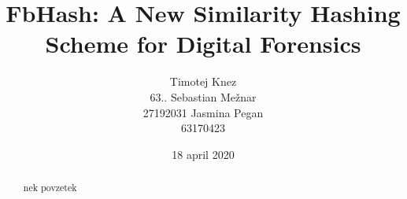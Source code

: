 \documentclass{acm_proc_article-sp}
\begin{document}
\title{FbHash: A New Similarity Hashing Scheme for Digital Forensics}

\author{
\alignauthor
Timotej Knez \\
63..%
\alignauthor
Sebastian Mežnar\\
27192031 %
\alignauthor 
Jasmina Pegan \\
63170423%
}

\date{18 april 2020}

\maketitle
\begin{abstract}
nek povzetek
\end{abstract}



\end{document}
